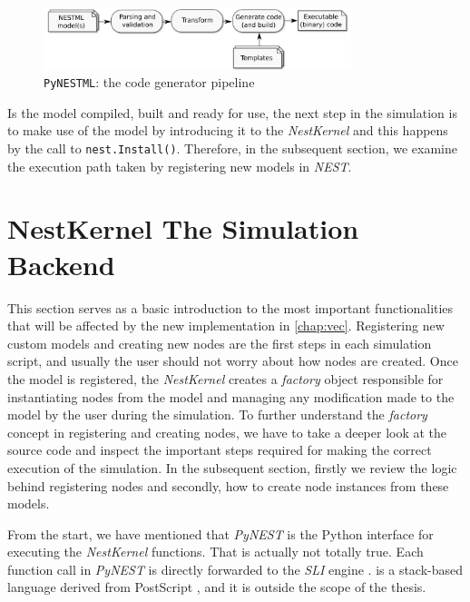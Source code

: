 \begin{figure}[h!]
\centering
\includegraphics[width=0.8\textwidth]{src/pic/internal_workflow.png}
\caption{\texttt{PyNESTML}: the code generator pipeline}
\label{fig:pynestml_workflow}
\end{figure}



Is the model compiled, built and ready for use, the next step in the simulation is to make use of the model by introducing it to the \emph{NestKernel} and this happens by the call to \texttt{nest.Install()}. Therefore, in the subsequent section, we examine the execution path taken by registering new models in \emph{NEST}.

\section{NestKernel The Simulation Backend}


This section serves as a basic introduction to the most important functionalities that will be affected by the new implementation in \autoref{chap:vec}. Registering new custom models and creating new nodes are the first steps in each simulation script, and usually the user should not worry about how nodes are created. Once the model is registered, the \emph{NestKernel} creates a \emph{factory} object responsible for instantiating nodes from the model and managing any modification made to the model by the user during the simulation. To further understand the \emph{factory} concept in registering and creating nodes, we have to take a deeper look at the source code and inspect the important steps required for making the correct execution of the simulation. In the subsequent section, firstly we review the logic behind registering nodes and secondly, how to create node instances from these models.

From the start, we have mentioned that \emph{PyNEST} is the Python interface for executing the \emph{NestKernel} functions. That is actually not totally true. Each function call in \emph{PyNEST} is directly forwarded to the \emph{SLI} engine \citep{gewaltig2007nest}.  is a stack-based language derived from PostScript \citep{adobe1990postscript}, and it is outside the scope of the thesis.

